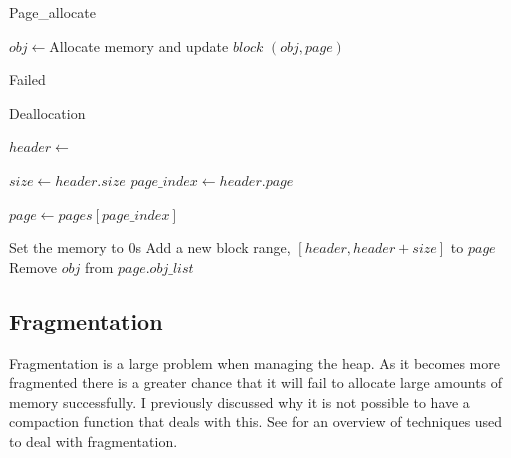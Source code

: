 \documentclass[../diss.tex]{subfiles}
\begin{document}
\begin{algorithm}
\caption{Page\_allocate}
\label{alg:pageallocate}
\begin{algorithmic}



    
            \State $obj\gets $Allocate memory and update $block$
            \State \Return $(obj, page)$
        \EndIf
    
    \EndFor

\EndFor

\State \Return Failed

\EndFunction

\end{algorithmic}
\end{algorithm}


\begin{algorithm}
\caption{Deallocation}
\label{alg:deallocation}
\begin{algorithmic}


\State $header\gets $ 

\State $size\gets header.size$ 
\State $page\_index\gets header.page$

\State $page\gets pages[page\_index]$

\State
\State Set the memory to 0s
\State Add a new block range, $[header, header + size]$ to $page$
\State Remove $obj$ from $page.obj\_list$

\EndFunction

\end{algorithmic}
\end{algorithm}

\subsection{Fragmentation} \label{sec:fragmentation}

Fragmentation is a large problem when managing the heap. As it becomes more fragmented there is a greater chance that it will fail to allocate large amounts of memory successfully. I previously discussed why it is not possible to have a compaction function that deals with this. See \cite{fragmentation} for an overview of techniques used to deal with fragmentation.
\end{document}
